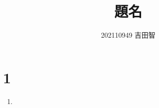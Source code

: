 \documentclass[dvipdfmx]{jarticle}
\begin{document}
\title{題名}
\author{202110949 吉田智}
\date{}
\maketitle

\section*{1}
\begin{enumerate}[(1)]
    \item 
\end{enumerate}
\end{document}
